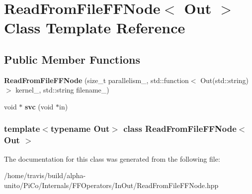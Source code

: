 \hypertarget{class_read_from_file_f_f_node}{\section{\-Read\-From\-File\-F\-F\-Node$<$ \-Out $>$ \-Class \-Template \-Reference}
\label{class_read_from_file_f_f_node}
}
\subsection*{\-Public \-Member \-Functions}
\begin{DoxyCompactItemize}
\item 
\hypertarget{class_read_from_file_f_f_node_aed211e6b44010772cb9dcbc4c6e595f9}{{\bfseries \-Read\-From\-File\-F\-F\-Node} (size\-\_\-t parallelism\-\_\-, std\-::function$<$ \-Out(std\-::string)$>$ kernel\-\_\-, std\-::string filename\-\_\-)}\label{class_read_from_file_f_f_node_aed211e6b44010772cb9dcbc4c6e595f9}

\item 
\hypertarget{class_read_from_file_f_f_node_a0fb617afdb7e1313509aa92caa1b9856}{void $\ast$ {\bfseries svc} (void $\ast$in)}\label{class_read_from_file_f_f_node_a0fb617afdb7e1313509aa92caa1b9856}

\end{DoxyCompactItemize}
\subsubsection*{template$<$typename \-Out$>$ class Read\-From\-File\-F\-F\-Node$<$ Out $>$}



\-The documentation for this class was generated from the following file\-:\begin{DoxyCompactItemize}
\item 
/home/travis/build/alpha-\/unito/\-Pi\-Co/\-Internals/\-F\-F\-Operators/\-In\-Out/\-Read\-From\-File\-F\-F\-Node.\-hpp\end{DoxyCompactItemize}
